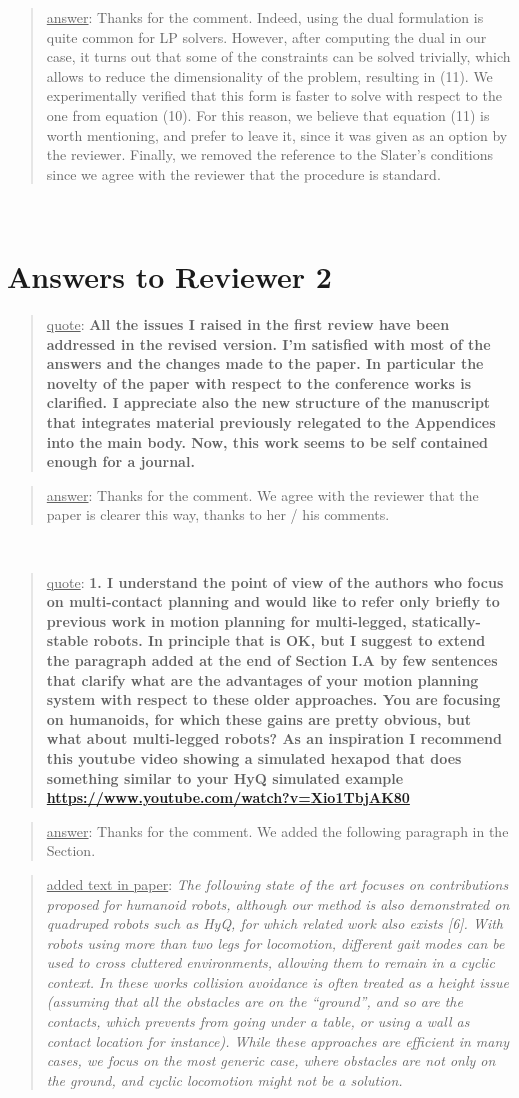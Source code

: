 \documentclass[a4paper]{article}
\newcommand\quot[1]{\begin{quote} \underline{quote}: \textbf{#1}\end{quote}}
\newcommand\as[1]{\begin{quote} \underline{answer}: {#1}\end{quote} }
\newcommand\qt[1]{\begin{quote} \underline{added text in paper}: \textit{#1}\end{quote} \leavevmode \\ }
\begin{document}
\as{Thanks for the comment. Indeed, using the dual formulation is quite common for LP solvers. However, after computing the dual in our case, it turns out that some of the constraints can be solved trivially, which allows to reduce the dimensionality of the problem, resulting in (11). We experimentally verified that this form is faster to solve with respect to the one from equation (10). For this reason, we believe that equation (11) is worth mentioning, and prefer to leave it, since it was given as an option by the reviewer. Finally, we removed the reference to the Slater's conditions since we agree with the reviewer that the procedure is standard.}

\leavevmode \\
\section{Answers to Reviewer 2}
\quot{All the issues I raised in the first review have been addressed in
the revised version. I'm satisfied with most of the answers and the
changes made to the paper. In particular the novelty of the paper with
respect to the conference works is clarified. I appreciate also the new
structure of the manuscript that integrates material previously
relegated to the Appendices into the main body. Now, this work seems to
be self contained enough for a journal. }
\as{Thanks for the comment. We agree with the reviewer that the paper is clearer this way, thanks to her / his comments.}

\leavevmode \\
\quot{
1. I understand the point of view of the authors who focus on
multi-contact planning and would like to refer only briefly to previous
work in motion planning for multi-legged, statically-stable robots. In
principle that is OK, but I suggest to extend the paragraph added at
the end of Section I.A by few sentences that clarify what are the
advantages of your motion planning system with respect to these older
approaches. You are focusing on humanoids, for which these gains are
pretty obvious, but what about multi-legged robots? As an inspiration I
recommend this youtube video showing a simulated hexapod that does
something similar to your HyQ simulated example
\url{https://www.youtube.com/watch?v=Xio1TbjAK80}}

\as{Thanks for the comment. We added the following paragraph in the Section.}
\qt{The following state of the art focuses on contributions proposed for humanoid robots, although our method is also demonstrated on quadruped robots such as HyQ, for which related work also exists [6]. With robots using more than two legs for locomotion, different gait modes can be used to cross cluttered environments, allowing them to remain in a cyclic context. In these works collision avoidance is often treated as a height issue (assuming that all the obstacles are on the ``ground'', and so are the contacts, which prevents from going under a table, or using a wall as contact location for instance). While these approaches are efficient in many cases, we focus on the most generic case, where obstacles are not only on the ground, and cyclic locomotion might not be a solution.}
\leavevmode \\
\end{document}
